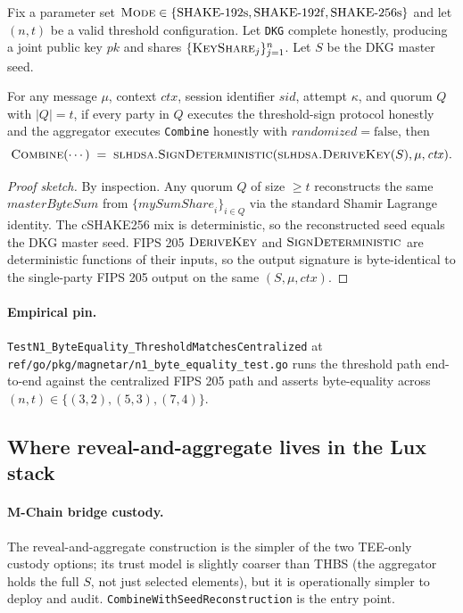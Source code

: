 \begin{theorem}
\label{thm:reveal-byte-equality}
Fix a parameter set $\textsc{Mode} \in \{\mathrm{SHAKE\text{-}192s},
\mathrm{SHAKE\text{-}192f}, \mathrm{SHAKE\text{-}256s}\}$ and let
$(n, t)$ be a valid threshold configuration. Let \texttt{DKG}
complete honestly, producing a joint public key $pk$ and shares
$\{\textsc{KeyShare}_j\}_{j=1}^n$. Let $S$ be the DKG master seed.

For any message $\mu$, context $\mathit{ctx}$, session identifier
$\mathit{sid}$, attempt $\kappa$, and quorum $Q$ with $|Q| = t$, if
every party in $Q$ executes the threshold-sign protocol honestly
and the aggregator executes \texttt{Combine} honestly with
$\mathit{randomized} = \mathrm{false}$, then
\begin{equation*}
  \textsc{Combine}(\cdots)
  \;=\;
  \textsc{slhdsa.SignDeterministic}(\textsc{slhdsa.DeriveKey}(S),
    \mu, \mathit{ctx}).
\end{equation*}
\end{theorem}

\begin{proof}[Proof sketch]
By inspection. Any quorum $Q$ of size $\ge t$ reconstructs the
same $\mathit{masterByteSum}$ from $\{\mathit{mySumShare}_i\}_{i
\in Q}$ via the standard Shamir Lagrange identity. The cSHAKE256
mix is deterministic, so the reconstructed seed equals the DKG
master seed. FIPS 205 $\textsc{DeriveKey}$ and
$\textsc{SignDeterministic}$ are deterministic functions of their
inputs, so the output signature is byte-identical to the
single-party FIPS 205 output on the same $(S, \mu, \mathit{ctx})$.
\end{proof}

\paragraph{Empirical pin.}
\texttt{TestN1\_ByteEquality\_ThresholdMatchesCentralized} at
\texttt{ref/go/pkg/magnetar/n1\_byte\_equality\_test.go} runs the
threshold path end-to-end against the centralized FIPS 205 path
and asserts byte-equality across $(n, t) \in \{(3,2), (5,3),
(7,4)\}$.

\subsection{Where reveal-and-aggregate lives in the Lux stack}
\label{app:reveal:where}

\paragraph{M-Chain bridge custody.} The reveal-and-aggregate
construction is the simpler of the two TEE-only custody options;
its trust model is slightly coarser than THBS (the aggregator
holds the full $S$, not just selected elements), but it is
operationally simpler to deploy and audit.
\texttt{CombineWithSeedReconstruction} is the entry point.

